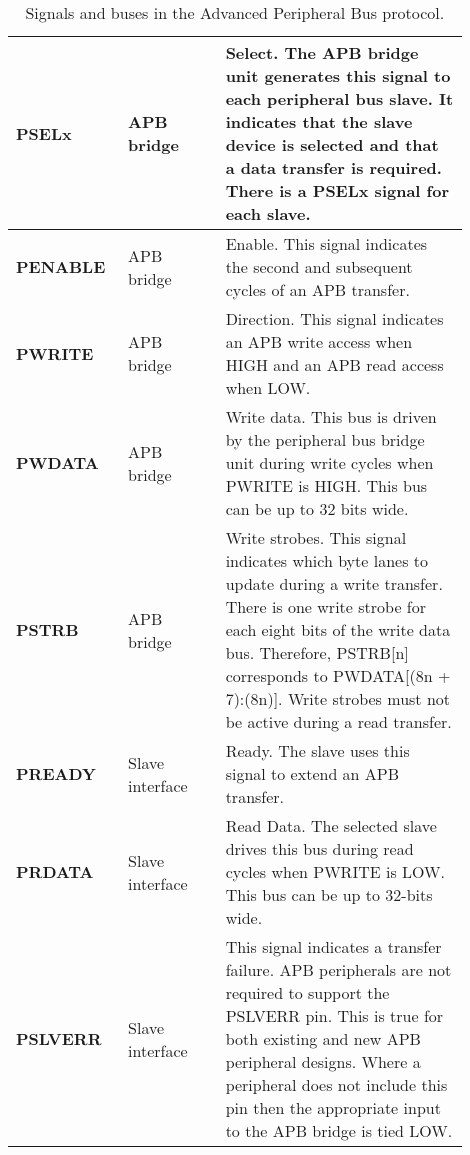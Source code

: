 \begin{table}
\begin{tabular}{p{0.2\linewidth}|p{0.2\linewidth}|p{0.5\linewidth}}
    \textbf{PSELx}    & APB bridge             & Select. The APB bridge unit generates this signal to each peripheral bus slave. It indicates that the slave device is selected and that a data transfer is required. There is a PSELx signal for each slave.                                                                      \\ \hline
    \textbf{PENABLE}  & APB bridge             & Enable. This signal indicates the second and subsequent cycles of an APB transfer.                                                                                                                                                                                                \\ \hline
    \textbf{PWRITE}   & APB bridge             & Direction. This signal indicates an APB write access when HIGH and an APB read access when LOW.                                                                                                                                                                                   \\ \hline
    \textbf{PWDATA}   & APB bridge             & Write data. This bus is driven by the peripheral bus bridge unit during write cycles when PWRITE is HIGH. This bus can be up to 32 bits wide.                                                                                                                                     \\ \hline
    \textbf{PSTRB}    & APB bridge             & Write strobes. This signal indicates which byte lanes to update during a write transfer. There is one write strobe for each eight bits of the write data bus. Therefore, PSTRB[n] corresponds to PWDATA[(8n + 7):(8n)]. Write strobes must not be active during a read transfer.  \\ \hline
    \textbf{PREADY}   & Slave interface        & Ready. The slave uses this signal to extend an APB transfer.                                                                                                                                                                                                                      \\ \hline
    \textbf{PRDATA}   & Slave interface        & Read Data. The selected slave drives this bus during read cycles when PWRITE is LOW. This bus can be up to 32-bits wide.                                                                                                                                                         \\ \hline
    \textbf{PSLVERR}  & Slave interface        & This signal indicates a transfer failure. APB peripherals are not required to support the PSLVERR pin. This is true for both existing and new APB peripheral designs. Where a peripheral does not include this pin then the appropriate input to the APB bridge is tied LOW.      \\ \hline
    \end{tabular}
    \caption{Signals and buses in the Advanced Peripheral Bus protocol.}
    \label{tbl:apb-signals}
\end{table}


